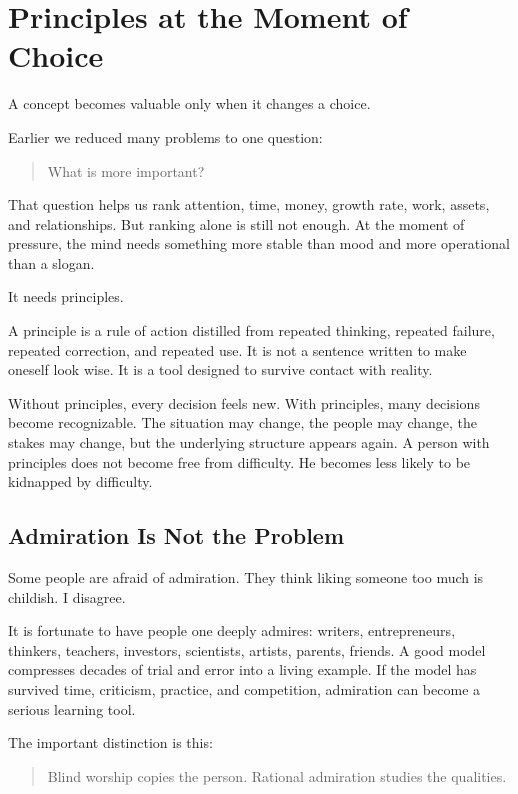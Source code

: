 \chapter{Principles at the Moment of Choice}

A concept becomes valuable only when it changes a choice.

Earlier we reduced many problems to one question:

\begin{quote}
What is more important?
\end{quote}

That question helps us rank attention, time, money, growth rate, work, assets, and relationships. But ranking alone is still not enough. At the moment of pressure, the mind needs something more stable than mood and more operational than a slogan.

It needs principles.

A principle is a rule of action distilled from repeated thinking, repeated failure, repeated correction, and repeated use. It is not a sentence written to make oneself look wise. It is a tool designed to survive contact with reality.

Without principles, every decision feels new. With principles, many decisions become recognizable. The situation may change, the people may change, the stakes may change, but the underlying structure appears again. A person with principles does not become free from difficulty. He becomes less likely to be kidnapped by difficulty.

\section*{Admiration Is Not the Problem}

Some people are afraid of admiration. They think liking someone too much is childish. I disagree.

It is fortunate to have people one deeply admires: writers, entrepreneurs, thinkers, teachers, investors, scientists, artists, parents, friends. A good model compresses decades of trial and error into a living example. If the model has survived time, criticism, practice, and competition, admiration can become a serious learning tool.

The important distinction is this:

\begin{quote}
Blind worship copies the person. Rational admiration studies the qualities.
\end{quote}

